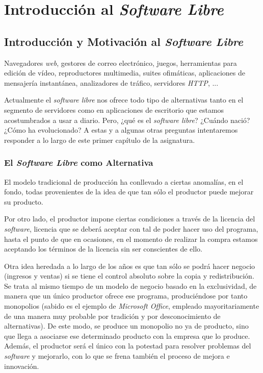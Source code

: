 \chapter{Introducción al \textit{Software Libre}}
\section{Introducción y Motivación al \textit{Software Libre}}

Navegadores \textit{web}, gestores de correo electrónico, juegos, herramientas
para edición de vídeo, reproductores multimedia, suites ofimáticas, aplicaciones
de mensajería instantánea, analizadores de tráfico, servidores \textit{HTTP},
...

Actualmente el \textit{software libre} nos ofrece todo tipo de alternativas
tanto en el segmento de servidores como en aplicaciones de escritorio que
estamos acostumbrados a usar a diario. Pero, ¿qué es el \textit{software libre}?
¿Cuándo nació? ¿Cómo ha evolucionado? A estas y a algunas otras preguntas
intentaremos responder a lo largo de este primer capítulo de la asignatura.

\subsection{El \textit{Software Libre} como Alternativa}

El modelo tradicional de producción ha conllevado a ciertas anomalías, en el
fondo, todas provenientes de la idea de que tan sólo el productor puede mejorar
su producto.

Por otro lado, el productor impone ciertas condiciones a través de
la licencia del \textit{software}, licencia que se deberá aceptar con tal de
poder hacer uso del programa, hasta el punto de que en ocasiones, en el momento
de realizar la compra estamos aceptando los términos de la licencia sin ser
conscientes de ello.

Otra idea heredada a lo largo de los años es que tan sólo se podrá hacer
negocio (ingresos y ventas) si se tiene el control absoluto sobre la copia y
redistribución. Se trata al mismo tiempo de un modelo de negocio basado en la
exclusividad, de manera que un único productor ofrece ese programa,
produciéndose por tanto monopolios (sabido es el ejemplo de \textit{Microsoft
Office}, empleado mayoritariamente de una manera muy probable por tradición y
por desconocimiento de alternativas). De este modo, se produce un
monopolio no ya de producto, sino que llega a asociarse ese determinado
producto con la empresa que lo produce. Además, el productor será el único con
la potestad para resolver problemas del \textit{software} y mejorarlo, con lo
que se frena también el proceso de mejora e innovación.


